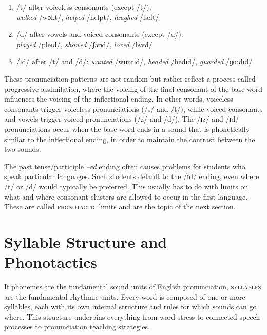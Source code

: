 \begin{enumerate}[noitemsep]
    \item /t/ after voiceless consonants (except /t/): \\\textit{walked} /wɔkt/, \textit{helped} /helpt/, \textit{laughed} /læft/
    \item /d/ after vowels and voiced consonants (except /d/): \\\textit{played} /pleɪd/, \textit{showed} /ʃəʊd/, \textit{loved} /lʌvd/
    \item /ɪd/ after /t/ and /d/: \textit{wanted} /wɒntɪd/, \textit{headed} /hedɪd/, \textit{guarded} /ɡɑ:dɪd/
\end{enumerate}

These pronunciation patterns are not random but rather reflect a process called progressive assimilation, where the voicing of the final consonant of the base word influences the voicing of the inflectional ending. In other words, voiceless consonants trigger voiceless pronunciations (/s/ and /t/), while voiced consonants and vowels trigger voiced pronunciations (/z/ and /d/). The /ɪz/ and /ɪd/ pronunciations occur when the base word ends in a sound that is phonetically similar to the inflectional ending, in order to maintain the contrast between the two sounds.

The past tense/participle \textit{--ed} ending often causes problems for students who speak particular languages. Such students default to the /ɪd/ ending, even where /t/ or /d/ would typically be preferred. This usually has to do with limits on what and where consonant clusters are allowed to occur in the first language. These are called \textsc{phonotactic} limits and are the topic of the next section.

\section{Syllable Structure and Phonotactics} \label{sec:phonotactics}

If phonemes are the fundamental sound units of English pronunciation, \textsc{syllables} are the fundamental rhythmic units. Every word is composed of one or more syllables, each with its own internal structure and rules for which sounds can go where. This structure underpins everything from word stress to connected speech processes to pronunciation teaching strategies.


